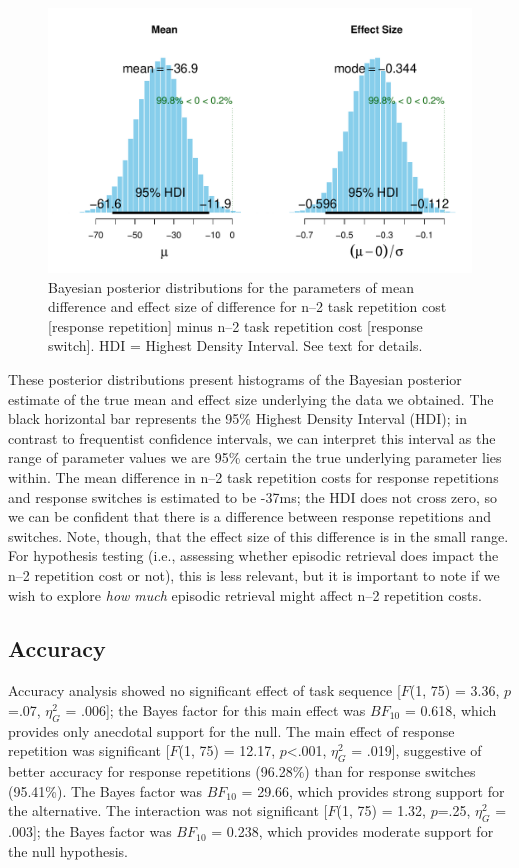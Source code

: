 \documentclass[a4paper, doc, natbib]{apa6}
\begin{document}
\begin{figure}
\begin{center}
\includegraphics[width = \textwidth]{Images/bayesParameter.pdf}
\caption{Bayesian posterior distributions for the parameters of mean difference and effect size of difference for n--2 task repetition cost [response repetition] minus n--2 task repetition cost [response switch]. HDI = Highest Density Interval. See text for details.}
\label{fig:bayesParameter}
\end{center}
\end{figure}

These posterior distributions present histograms of the Bayesian posterior estimate of the true mean and effect size underlying the data we obtained. The black horizontal bar represents the 95\% Highest Density Interval (HDI); in contrast to frequentist confidence intervals, we can interpret this interval as the range of parameter values we are 95\% certain the true underlying parameter lies within. The mean difference in n--2 task repetition costs for response repetitions and response switches is estimated to be -37ms; the HDI does not cross zero, so we can be confident that there is a difference between response repetitions and switches. Note, though, that the effect size of this difference is in the small range. For hypothesis testing (i.e., assessing whether episodic retrieval does impact the n--2 repetition cost or not), this is less relevant, but it is important to note if we wish to explore \emph{how much} episodic retrieval might affect n--2 repetition costs.

\subsection{Accuracy}
Accuracy analysis showed no significant effect of task sequence [$F$(1, 75) = 3.36, $p$=.07, $\eta_G^2$ = .006]; the Bayes factor for this main effect was $BF_{10}$ = 0.618, which provides only anecdotal support for the null. The main effect of response repetition was significant [$F$(1, 75) = 12.17, $p$<.001, $\eta_G^2$ = .019], suggestive of better accuracy for response repetitions (96.28\%) than for response switches (95.41\%). The Bayes factor was $BF_{10}$ = 29.66, which provides strong support for the alternative. The interaction was not significant [$F$(1, 75) = 1.32, $p$=.25, $\eta_G^2$ = .003]; the Bayes factor was $BF_{10}$ = 0.238, which provides moderate support for the null hypothesis.
\end{document}
